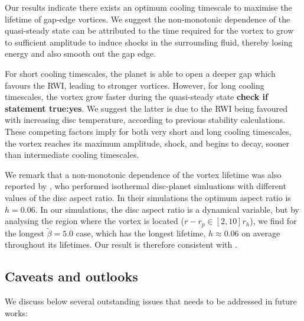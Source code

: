 
Our results indicate there exists an optimum cooling timescale to
maximise the lifetime of gap-edge vortices. We suggest the
non-monotonic dependence of the quasi-steady state can be attributed
to the time required for the vortex to grow to sufficient amplitude to
induce shocks in the surrounding fluid, thereby losing energy and also
smooth out the gap edge.  

For short cooling timescales, the planet is able to open a
deeper gap which favours the RWI, leading to stronger
vortices. However, for long  cooling timescales, the vortex grow
faster during the quasi-steady state {\bf check if statement true:yes}. We
suggest the latter is due to the RWI being favoured with increasing
disc temperature, according to previous stability calculations. These
competing factors imply for both very short and long cooling
timescales, the vortex reaches its maximum amplitude, shock, and
begins to decay, sooner than intermediate cooling timescales.   


We remark that a non-monotonic dependence of the vortex lifetime was
also reported by \cite{fu14}, who performed isothermal disc-planet
simluations with different values of the   
disc aspect ratio. In their simulations the optimum aspect ratio is
$h=0.06$. In our simulations, the disc aspect ratio is a dynamical
variable, but by analysing the region where the vortex is located
($r-r_p\in[2,10]r_h$), %
we find for the longest  $\tilde\beta=5.0$ case, which has the longest lifetime,
$h\approx0.06$ on average throughout its lifetimes. 
Our result is therefore consistent with \citep{fu14}. 


\subsection{Caveats and outlooks}
We discuss below several outstanding issues that needs to be addressed
in future works: 

